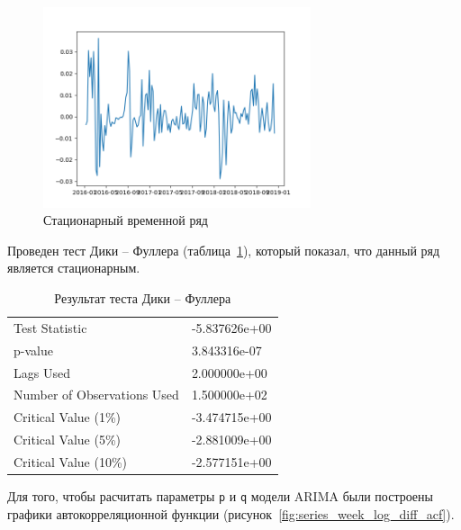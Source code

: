 \begin{figure}[H]
    \centering
        \includegraphics[width=0.7\textwidth]{series_week_log_diff}
    \caption{Стационарный временной ряд}
    \label{fig:series_week_log_diff}
\end{figure}

Проведен тест Дики -- Фуллера (таблица~\ref{tab:df_test_results}), который показал, что данный ряд является стационарным.

\begin{table}[H]
  \caption{Результат теста Дики -- Фуллера}
  \begin{tabular}{l|l}
    Test Statistic &                -5.837626e+00 \\
    p-value &                        3.843316e-07 \\
    Lags Used &                     2.000000e+00 \\
    Number of Observations Used &    1.500000e+02 \\
    Critical Value (1\%) &          -3.474715e+00 \\
    Critical Value (5\%) &          -2.881009e+00 \\
    Critical Value (10\%) &          -2.577151e+00 \\
  \end{tabular}
  \label{tab:df_test_results}
\end{table}

Для того, чтобы расчитать параметры \texttt{p} и \texttt{q} модели ARIMA были построены графики автокорреляционной функции (рисунок~\ref{fig:series_week_log_diff_acf}).

